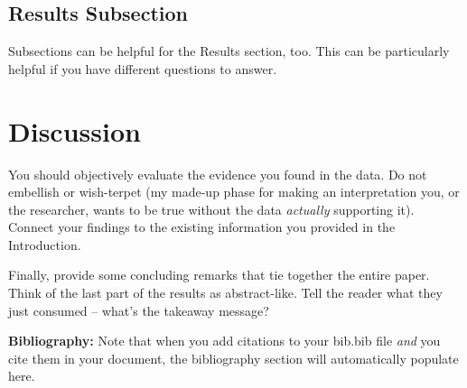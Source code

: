 \documentclass{article}\usepackage[]{graphicx}\usepackage[]{xcolor}
\begin{document}
\begin{multicols}{2}
\subsection{Results Subsection}
Subsections can be helpful for the Results section, too. This can be particularly helpful if you have different questions to answer. 


\section{Discussion}
 You should objectively evaluate the evidence you found in the data. Do not embellish or wish-terpet (my made-up phase for making an interpretation you, or the researcher, wants to be true without the data \emph{actually} supporting it). Connect your findings to the existing information you provided in the Introduction.

Finally, provide some concluding remarks that tie together the entire paper. Think of the last part of the results as abstract-like. Tell the reader what they just consumed -- what's the takeaway message?

\vspace{2em}

\noindent\textbf{Bibliography:} Note that when you add citations to your bib.bib file \emph{and}
you cite them in your document, the bibliography section will automatically populate here.

\begin{tiny}

\end{tiny}
\end{multicols}

\newpage
\onecolumn
\end{document}
